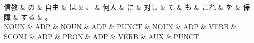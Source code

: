 \documentclass[tikz,border=5pt]{standalone}
\begin{document}
\normalsize
\begin{dependency}[edge unit distance=12.0pt]
    \begin{deptext}[column sep=1em]
        信教 \& の \& 自由 \& は \& 、 \& 何人 \& に \& 対し \& て \& も \& これ \& を \& 保障 \& する \& 。\\
        NOUN \& ADP \& NOUN \& ADP \& PUNCT \& NOUN \& ADP \& VERB \& SCONJ \& ADP \& PRON \& ADP \& VERB \& AUX \& PUNCT\\
    \end{deptext}
\end{dependency}
\end{document}
